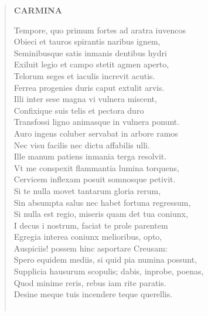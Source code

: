 \documentclass[11pt, a4paper]{report}
\begin{document}
\begin{verse}
    \begin{center} \textbf{CARMINA} \end{center} \marginpar{[70]} Tempore, quo primum fortes ad aratra iuvencos \\ Obieci et tauros spirantis naribus ignem, \\ Seminibusque satis inmanis dentibus hydri \\ Exiluit legio et campo stetit agmen aperto, \\ Telorum seges et iaculis increvit acutis. \\ Ferrea progenies duris caput extulit arvis. \\ Illi inter sese magna vi vulnera miscent, \\ Confixique suis telis et pectora duro \\ Transfossi ligno animasque in vulnera ponunt. \\ Auro ingens coluber servabat in arbore ramos \\ Nec visu facilis nec dictu affabilis ulli. \\ Ille manum patiens inmania terga resolvit. \\ Vt me conspexit flammantia lumina torquens, \\ Cervicem inflexam posuit somnosque petivit. \\ Si te nulla movet tantarum gloria rerum, \\ Sin absumpta salus nec habet fortuna regressum, \\ Si nulla est regio, miseris quam det tua coniunx, \\ I decus i nostrum, faciat te prole parentem \\ Egregia interea coniunx melioribus, opto, \\ Auspiciis!  \lbrack  possem  \rbrack  hinc asportare Creusam: \\ Spero equidem mediis, si quid pia numina possunt, \\ Supplicia hausurum scopulis; dabis, inprobe, poenas, \\ Quod minime reris, rebus iam rite paratis. \\ Desine meque tuis incendere teque querellis. \\ 
        ﻿\pagebreak 

\end{verse}
\end{document}
